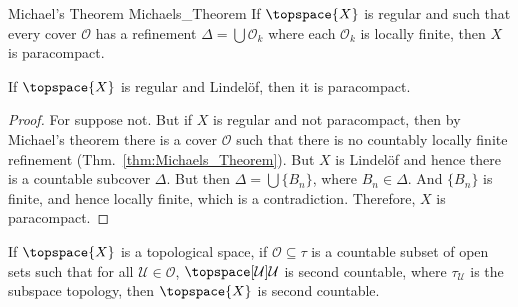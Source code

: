 \documentclass{article}                                                        %
\begin{document}
            \begin{ftheorem}{Michael's Theorem}
                            {Michaels_Theorem}
                If $\topspace{X}$ is regular and such that every cover
                $\mathcal{O}$ has a refinement $\Delta=\bigcup\mathcal{O}_{k}$
                where each $\mathcal{O}_{k}$ is locally finite, then $X$ is
                paracompact.
            \end{ftheorem}
            \begin{theorem}
                \label{thm:Regular_Lindelof_is_Paracompact}%
                If $\topspace{X}$ is regular and Lindel\"{o}f, then it is
                paracompact.
            \end{theorem}
            \begin{proof}
                For suppose not. But if $X$ is regular and not paracompact, then
                by Michael's theorem there is a cover $\mathcal{O}$ such that
                there is no countably locally finite refinement
                (Thm.~\ref{thm:Michaels_Theorem}). But $X$ is Lindel\"{o}f and
                hence there is a countable subcover $\Delta$. But then
                $\Delta=\bigcup\{B_{n}\}$, where $B_{n}\in\Delta$. And
                $\{B_{n}\}$ is finite, and hence locally finite, which is a
                contradiction. Therefore, $X$ is paracompact.
            \end{proof}
            \begin{theorem}
                \label{thm:Count_Open_Cover_of_Sec_Count_Implies_Sec_Count}%
                If $\topspace{X}$ is a topological space, if
                $\mathcal{O}\subseteq\tau$ is a countable subset of open sets such
                that for all $\mathcal{U}\in\mathcal{O}$,
                $\topspace[\mathcal{U}]{\mathcal{U}}$ is second countable, where
                $\tau_{\mathcal{U}}$ is the subspace topology, then $\topspace{X}$
                is second countable.
            \end{theorem}
\end{document}
